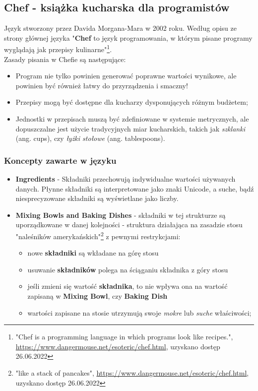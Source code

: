 \documentclass[fleqn,10pt]{SelfArx} %
\begin{document}
\subsection{Chef - książka kucharska dla programistów}		%
Język stworzony przez Davida Morgana-Mara w 2002 roku.
Według opisu ze strony głównej języka "\textbf{Chef} to język programowania, w którym pisane programy wyglądają jak przepisy kulinarne"\footnote{"Chef is a programming language in which programs look like recipes.", \url{https://www.dangermouse.net/esoteric/chef.html}, uzyskano dostęp 26.06.2022}.\\
Zasady pisania w Chefie są następujące\cite{eso:ChefHomepage}:
\begin{itemize}
	\item Program nie tylko powinien generować poprawne wartości wynikowe, ale powinien być również łatwy do przyrządzenia i smaczny!
	\item Przepisy mogą być dostępne dla kucharzy dysponujących różnym budżetem;
	\item Jednostki w przepisach muszą być zdefiniowane w systemie metrycznych, ale dopuszczalne jest użycie tradycyjnych miar kucharskich, takich jak \textit{szklanki} (ang. cups), czy \textit{łyżki stołowe} (ang. tablespoons).
\end{itemize}

\subsubsection{Koncepty zawarte w języku}
\begin{itemize}
	\item \textbf{Ingredients} - Składniki przechowują indywidualne wartości używanych danych. Płynne składniki są interpretowane jako znaki Unicode, a suche, bądź niesprecyzowane składniki są wyświetlane jako liczby.
	\item \textbf{Mixing Bowls and Baking Dishes} - składniki w tej strukturze są uporządkowane w danej kolejności - struktura działająca na zasadzie stosu "naleśników amerykańskich"\footnote{"like a stack of pancakes", \url{https://www.dangermouse.net/esoteric/chef.html}, uzyskano dostęp 26.06.2022} z pewnymi restrykcjami:
	\begin{itemize}
		\item nowe \textbf{składniki} są wkładane na górę stosu
		\item usuwanie \textbf{składników} polega na ściąganiu składnika z góry stosu
		\item jeśli zmieni się wartość \textbf{składnika}, to nie wpływa ona na wartość zapisaną w \textbf{Mixing Bowl}, czy \textbf{Baking Dish}
		\item wartości zapisane na stosie utrzymują swoje \textit{mokre} lub \textit{suche} właściwości;
	\end{itemize}
\end{itemize}
\end{document}
